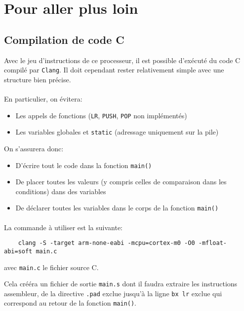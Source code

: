 \documentclass{article}
\begin{document}
    \section{Pour aller plus loin}

    \subsection{Compilation de code C}
    Avec le jeu d'instructions de ce processeur, il est possible d'exécuté du code C compilé par \texttt{Clang}.
    Il doit cependant rester relativement simple avec une structure bien précise.

    \paragraph{}
    En particulier, on évitera:
    \begin{itemize}
        \item Les appels de fonctions (\texttt{LR}, \texttt{PUSH}, \texttt{POP} non implémentés)
        \item Les variables globales et \texttt{static} (adressage uniquement sur la pile)
    \end{itemize}

    On s'assurera donc:
    \begin{itemize}
        \item D'écrire tout le code dans la fonction \texttt{main()}
        \item De placer toutes les valeurs (y compris celles de comparaison dans les conditions) dans des variables
        \item De déclarer toutes les variables dans le corps de la fonction \texttt{main()}
    \end{itemize}

    \paragraph{}
    La commande à utiliser est la suivante:
    \begin{lstlisting}
	clang -S -target arm-none-eabi -mcpu=cortex-m0 -O0 -mfloat-abi=soft main.c
    \end{lstlisting}
    avec \texttt{main.c} le fichier source C.

    Cela crééra un fichier de sortie \texttt{main.s} dont il faudra extraire les instructions assembleur,
    de la directive \texttt{.pad} exclue jusqu'à la ligne \texttt{bx lr} exclue qui correspond au retour de la fonction \texttt{main()}.
\end{document}
